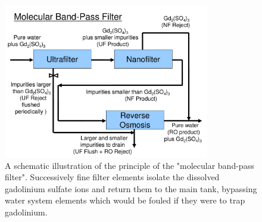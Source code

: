 \begin{figure}[htpb]
     \begin{center}
       \includegraphics[width=9cm]{figures/nuPRISM_bandpass.pdf}
       \caption{A schematic illustration of the principle of the "molecular band-pass filter".  
       Successively fine filter elements isolate the dissolved gadolinium sulfate ions and return
       them to the main tank, bypassing water system elements which would be fouled if they 
       were to trap gadolinium.}
       \label{water:bandpass}
     \end{center}
\end{figure}


\clearpage

%

